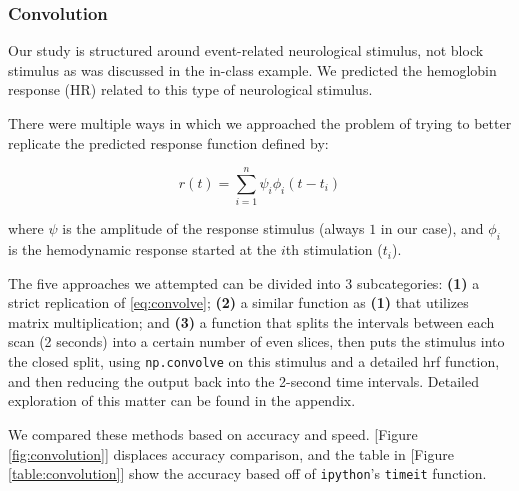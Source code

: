 \subsubsection{Convolution}
\par \indent Our study is structured around event-related neurological 
stimulus, not block stimulus as was discussed in the in-class example. We 
predicted the hemoglobin response (HR) related to this type of neurological 
stimulus. 

There were multiple ways in which we approached the problem of trying to 
better replicate the predicted response function defined by:

\begin{equation} \label{eq:convolve}
r(t)= \sum_{i=1}^n \psi_{i} \phi_{i}(t-t_i)
\end{equation}

where $\psi$ is the amplitude of the response stimulus (always $1$ in our 
case), and $\phi_{i}$ is the hemodynamic response started at the $i$th 
stimulation ($t_i$).

The five approaches we attempted can be divided into 3 subcategories: 
\textbf{(1)} a strict replication of \ref{eq:convolve}; \textbf{(2)} a similar 
function as \textbf{(1)} that utilizes matrix multiplication; and \textbf{(3)} a 
function that splits the intervals between each scan (2 seconds) into a certain 
number of even slices, then puts the stimulus into the closed split, using 
\texttt{np.convolve} on this stimulus and a detailed hrf function, and then 
reducing the output back into the 2-second time intervals. Detailed exploration 
of this matter can be found in the appendix.

We compared these methods based on accuracy and speed. [Figure 
\ref{fig:convolution}] displaces accuracy comparison, and the table in [Figure 
\ref{table:convolution}] show the accuracy based off of \texttt{ipython}'s 
\texttt{timeit} function.



